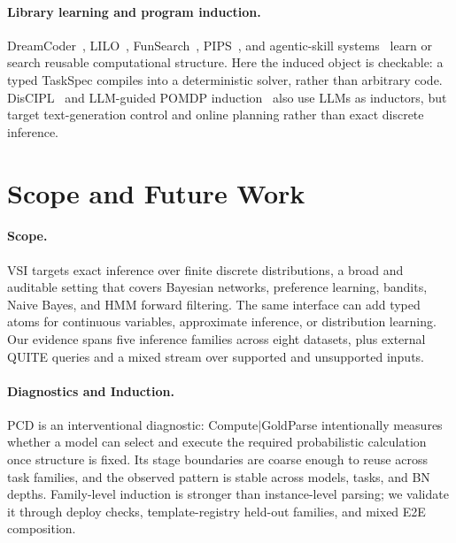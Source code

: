 \documentclass{article}
\newcommand{\method}{VSI}
\newcommand{\taskspec}{TaskSpec}
\begin{document}
\paragraph{Library learning and program induction.}
DreamCoder~\citep{ellis2021dreamcoder}, LILO~\citep{grand2024lilo}, FunSearch~\citep{romeraparedes2024funsearch}, PIPS~\citep{stein2025pips}, and agentic-skill systems~\citep{zhang2026evoskills} learn or search reusable computational structure.
Here the induced object is checkable: a typed \taskspec{} compiles into a deterministic solver, rather than arbitrary code.
DisCIPL~\citep{lew2025discipl} and LLM-guided POMDP induction~\citep{curtis2025pomdp} also use LLMs as inductors, but target text-generation control and online planning rather than exact discrete inference.

\section{Scope and Future Work}
\label{sec:limitations}

\paragraph{Scope.}
\method{} targets exact inference over finite discrete distributions, a broad and auditable setting that covers Bayesian networks, preference learning, bandits, Naive Bayes, and HMM forward filtering.
The same interface can add typed atoms for continuous variables, approximate inference, or distribution learning.
Our evidence spans five inference families across eight datasets, plus external QUITE queries and a mixed stream over supported and unsupported inputs.

\paragraph{Diagnostics and Induction.}
PCD is an interventional diagnostic: Compute$\mid$GoldParse intentionally measures whether a model can select and execute the required probabilistic calculation once structure is fixed.
Its stage boundaries are coarse enough to reuse across task families, and the observed pattern is stable across models, tasks, and BN depths.
Family-level induction is stronger than instance-level parsing; we validate it through deploy checks, template-registry held-out families, and mixed E2E composition.
\end{document}
